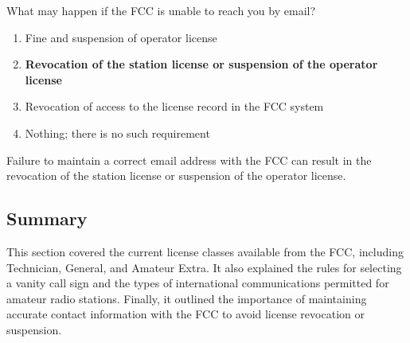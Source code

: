 \begin{tcolorbox}[colback=gray!10!white,colframe=black!75!black,title={T1C04}]
    What may happen if the FCC is unable to reach you by email?
    \begin{enumerate}[label=\Alph*,noitemsep]
        \item Fine and suspension of operator license
        \item \textbf{Revocation of the station license or suspension of the operator license}
        \item Revocation of access to the license record in the FCC system
        \item Nothing; there is no such requirement
    \end{enumerate}
\end{tcolorbox}
Failure to maintain a correct email address with the FCC can result in the revocation of the station license or suspension of the operator license.


\subsection*{Summary}
This section covered the current license classes available from the FCC, including Technician, General, and Amateur Extra. It also explained the rules for selecting a vanity call sign and the types of international communications permitted for amateur radio stations. Finally, it outlined the importance of maintaining accurate contact information with the FCC to avoid license revocation or suspension.
